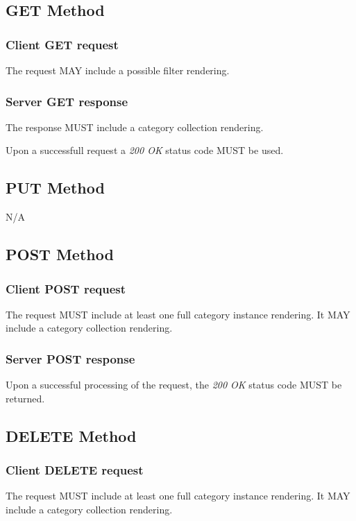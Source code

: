 \documentclass[10pt,a4paper]{article}
\begin{document}
\subsection{GET Method}

\subsubsection*{Client GET request}
The request MAY include a possible filter rendering.

\subsubsection*{Server GET response}
The response MUST include a category collection rendering.

Upon a successfull request a \emph{200 OK} status code MUST be used.

\subsection{PUT Method}

N/A

\subsection{POST Method}

\subsubsection*{Client POST request}
The request MUST include at least one full category instance rendering. It MAY include a category collection rendering.

\subsubsection*{Server POST response}
Upon a successful processing of the request, the \emph{200 OK} status code MUST be returned.

\subsection{DELETE Method}

\subsubsection*{Client DELETE request}
The request MUST include at least one full category instance rendering. It MAY include a category collection rendering.
\end{document}
